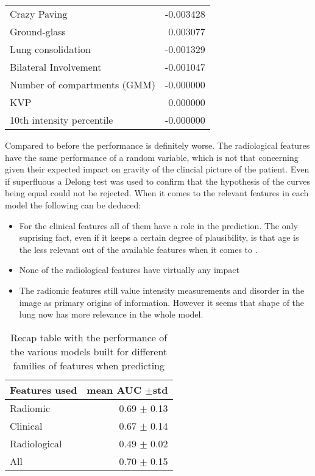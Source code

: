 \begin{table}
\begin{tabular}{lr}
		Crazy Paving                        &                     -0.003428 \\
		Ground-glass                        &                      0.003077 \\
		Lung consolidation                  &                     -0.001329 \\
		Bilateral Involvement               &                     -0.001047 \\
		Number of compartments (GMM)        &                     -0.000000 \\
		KVP                                 &                      0.000000 \\
		10th intensity percentile           &                     -0.000000 \\
		\bottomrule
		\end{tabular}
\end{table}

Compared to before the performance is definitely worse. 
The radiological features have the same performance of a random variable, which is not that concerning given their expected impact on gravity of the clincial picture of the patient.
Even if superfluous a Delong test was used to confirm that the hypothesis of the curves being equal could not be rejected. When it comes to the relevant features in each model the following can be deduced:

\begin{itemize}
\item For the clinical features all of them have a role in the prediction. The only suprising fact, even if it keeps a certain degree of plausibility, is that age is the less relevant out of the available features when it comes to \icu.
\item None of the radiological features have virtually any impact
\item The radiomic features still value intensity measurements and disorder in the image as primary origins of information. However it seems that shape of the lung now has more relevance in the whole model.
\end{itemize}

\begin{table}
\caption{Recap table with the performance of the various models built for different families of features when predicting \icu \label{tab:RecapICU}}
\centering
\begin{tabular}{l|r}
\toprule
Features used & mean AUC $\pm$std\\
\midrule
Radiomic  & 0.69 $\pm$ 0.13\\
Clinical  &  0.67 $\pm$ 0.14\\
Radiological & 0.49 $\pm$ 0.02\\
All & 0.70 $\pm$ 0.15 \\
\bottomrule
\end{tabular}
\end{table}


